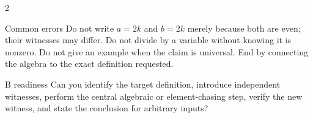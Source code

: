 \documentclass[10pt]{article}
\begin{document}
\begin{multicols}{2}
\begin{warningbox}{Common errors}
Do not write $a=2k$ and $b=2k$ merely because both are even; their witnesses
may differ. Do not divide by a variable without knowing it is nonzero. Do not
give an example when the claim is universal. End by connecting the algebra to
the exact definition requested.
\end{warningbox}

\begin{checklistbox}{B readiness}
Can you identify the target definition, introduce independent witnesses,
perform the central algebraic or element-chasing step, verify the new witness,
and state the conclusion for arbitrary inputs?
\end{checklistbox}
\end{multicols}

\clearpage
\end{document}
